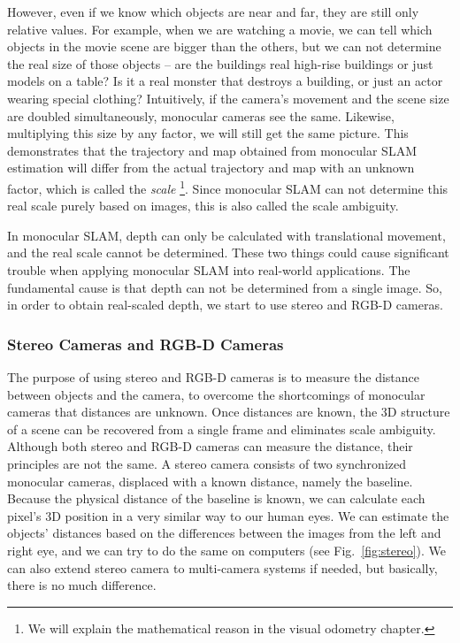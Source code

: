 However, even if we know which objects are near and far, they are still only relative values. For example, when we are watching a movie, we can tell which objects in the movie scene are bigger than the others, but we can not determine the real size of those objects -- are the buildings real high-rise buildings or just models on a table? Is it a real monster that destroys a building, or just an actor wearing special clothing? Intuitively, if the camera's movement and the scene size are doubled simultaneously, monocular cameras see the same. Likewise, multiplying this size by any factor, we will still get the same picture. This demonstrates that the trajectory and map obtained from monocular SLAM estimation will differ from the actual trajectory and map with an unknown factor, which is called the \textit{scale} \footnote{We will explain the mathematical reason in the visual odometry chapter.}. Since monocular SLAM can not determine this real scale purely based on images, this is also called the scale ambiguity.

In monocular SLAM, depth can only be calculated with translational movement, and the real scale cannot be determined. These two things could cause significant trouble when applying monocular SLAM into real-world applications. The fundamental cause is that depth can not be determined from a single image. So, in order to obtain real-scaled depth, we start to use stereo and RGB-D cameras.

\subsubsection{Stereo Cameras and RGB-D Cameras}
The purpose of using stereo and RGB-D cameras is to measure the distance between objects and the camera, to overcome the shortcomings of monocular cameras that distances are unknown. Once distances are known, the 3D structure of a scene can be recovered from a single frame and eliminates scale ambiguity. Although both stereo and RGB-D cameras can measure the distance, their principles are not the same. A stereo camera consists of two synchronized monocular cameras, displaced with a known distance, namely the baseline. Because the physical distance of the baseline is known, we can calculate each pixel's 3D position in a very similar way to our human eyes. We can estimate the objects' distances based on the differences between the images from the left and right eye, and we can try to do the same on computers (see Fig.~\ref{fig:stereo}). We can also extend stereo camera to multi-camera systems if needed, but basically, there is no much difference.

